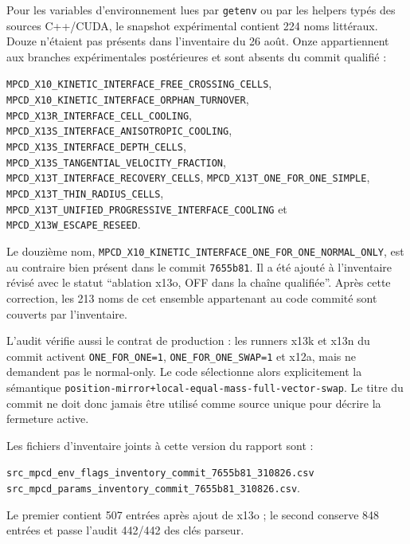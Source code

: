 \documentclass[11pt,a4paper]{article}
\begin{document}
Pour les variables d'environnement lues par \texttt{getenv} ou par les helpers typés des sources C++/CUDA, le snapshot expérimental contient 224 noms littéraux. Douze n'étaient pas présents dans l'inventaire du 26 août. Onze appartiennent aux branches expérimentales postérieures et sont absents du commit qualifié :
\begin{center}
\begin{minipage}{0.92\textwidth}
\small\raggedright
\nolinkurl{MPCD_X10_KINETIC_INTERFACE_FREE_CROSSING_CELLS},\linebreak
\nolinkurl{MPCD_X10_KINETIC_INTERFACE_ORPHAN_TURNOVER},\linebreak
\nolinkurl{MPCD_X13R_INTERFACE_CELL_COOLING},\linebreak
\nolinkurl{MPCD_X13S_INTERFACE_ANISOTROPIC_COOLING},\linebreak
\nolinkurl{MPCD_X13S_INTERFACE_DEPTH_CELLS},\linebreak
\nolinkurl{MPCD_X13S_TANGENTIAL_VELOCITY_FRACTION},\linebreak
\nolinkurl{MPCD_X13T_INTERFACE_RECOVERY_CELLS},\linebreak
\nolinkurl{MPCD_X13T_ONE_FOR_ONE_SIMPLE},\linebreak
\nolinkurl{MPCD_X13T_THIN_RADIUS_CELLS},\linebreak
\nolinkurl{MPCD_X13T_UNIFIED_PROGRESSIVE_INTERFACE_COOLING} et\linebreak
\nolinkurl{MPCD_X13W_ESCAPE_RESEED}.
\end{minipage}
\end{center}
Le douzième nom, \nolinkurl{MPCD_X10_KINETIC_INTERFACE_ONE_FOR_ONE_NORMAL_ONLY}, est au contraire bien présent dans le commit \texttt{7655b81}. Il a été ajouté à l'inventaire révisé avec le statut ``ablation x13o, OFF dans la chaîne qualifiée''. Après cette correction, les 213 noms de cet ensemble appartenant au code commité sont couverts par l'inventaire.

L'audit vérifie aussi le contrat de production : les runners x13k et x13n du commit activent \texttt{ONE\_FOR\_ONE=1}, \texttt{ONE\_FOR\_ONE\_SWAP=1} et x12a, mais ne demandent pas le normal-only. Le code sélectionne alors explicitement la sémantique \nolinkurl{position-mirror+local-equal-mass-full-vector-swap}. Le titre du commit ne doit donc jamais être utilisé comme source unique pour décrire la fermeture active.

Les fichiers d'inventaire joints à cette version du rapport sont :
\begin{center}
\small
\nolinkurl{src_mpcd_env_flags_inventory_commit_7655b81_310826.csv}\\
\nolinkurl{src_mpcd_params_inventory_commit_7655b81_310826.csv}.
\end{center}
Le premier contient 507 entrées après ajout de x13o ; le second conserve 848 entrées et passe l'audit 442/442 des clés parseur.
\end{document}
